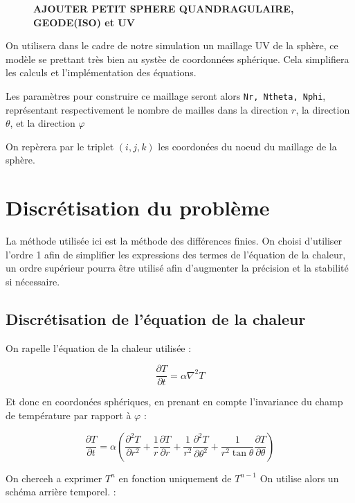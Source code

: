 \documentclass[fleqn]{article}
\renewcommand{\phi}{\varphi}
\begin{document}
\begin{figure}[H]
    \centering
    \textbf{AJOUTER PETIT SPHERE QUANDRAGULAIRE, GEODE(ISO) et UV}
\end{figure}

On utilisera dans le cadre de notre simulation un maillage UV de la sphère, ce modèle se prettant très bien au systèe de coordonnées sphérique. Cela simplifiera les calculs et l'implémentation des équations.

Les paramètres pour construire ce maillage seront alors \texttt{Nr, Ntheta, Nphi}, représentant respectivement le nombre de mailles dans la direction $r$, la direction $\theta$, et la direction $\phi$ 

On repèrera par le triplet $(i,j,k)$ les coordonées du noeud du maillage de la sphère. 

\newpage
\section{Discrétisation du problème} 
La méthode utilisée ici est la méthode des différences finies. On choisi d'utiliser l'ordre 1 afin de simplifier les expressions des termes de l'équation de la chaleur, un ordre supérieur pourra être utilisé afin d'augmenter la précision et la stabilité si nécessaire.
\subsection{Discrétisation de l'équation de la chaleur}
On rapelle l'équation de la chaleur utilisée :

\begin{equation}
    \frac{ \partial T}{\partial t}  =  \alpha \nabla^2 T
\end{equation}

Et donc en coordonées sphériques, en prenant en compte l'invariance du champ de température par rapport à $\phi$  :

\begin{equation}
    \frac{ \partial T}{\partial t}  = \alpha \left( 
    {\frac {\partial ^{2}T}{\partial r^{2}}}+{\frac {1}{r}}{\frac {\partial T}{\partial r}}+{\frac {1}{r^{2}}}{\frac {\partial ^{2}T}{\partial \theta ^{2}}}+{\frac {1}{r^{2}\tan \theta }}{\frac {\partial T}{\partial \theta }} \right)      
\end{equation}

On cherceh a exprimer $T^n $ en fonction uniquement de $T^{n-1}$ On utilise alors un schéma arrière temporel. : 
\end{document}
